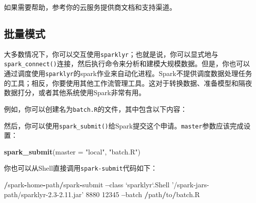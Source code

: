 \documentclass[
]{article}
\newenvironment{Shaded}{\begin{snugshade}}{\end{snugshade}}
\newcommand{\DataTypeTok}[1]{\textcolor[rgb]{0.13,0.29,0.53}{#1}}
\newcommand{\DecValTok}[1]{\textcolor[rgb]{0.00,0.00,0.81}{#1}}
\newcommand{\KeywordTok}[1]{\textcolor[rgb]{0.13,0.29,0.53}{\textbf{#1}}}
\newcommand{\NormalTok}[1]{#1}
\newcommand{\OperatorTok}[1]{\textcolor[rgb]{0.81,0.36,0.00}{\textbf{#1}}}
\newcommand{\StringTok}[1]{\textcolor[rgb]{0.31,0.60,0.02}{#1}}
\begin{document}
如果需要帮助，参考你的云服务提供商文档和支持渠道。

\hypertarget{ux6279ux91cfux6a21ux5f0f}{%
\subsection{批量模式}\label{ux6279ux91cfux6a21ux5f0f}}

大多数情况下，你可以交互使用\texttt{sparklyr}；也就是说，你可以显式地与\texttt{spark\_connect()}连接，然后执行命令来分析和建模大规模数据。但是，你也可以通过调度使用\texttt{sparklyr}的spark作业来自动化进程。Spark不提供调度数据处理任务的工具；相反，你要使用其他工作流管理工具。这对于转换数据、准备模型和隔夜数据打分，或者其他系统使用Spark非常有用。

例如，你可以创建名为\texttt{batch.R}的文件，其中包含以下内容：

\begin{Shaded}
\end{Shaded}

然后，你可以使用\texttt{spark\_submit()}给Spark提交这个申请。\texttt{master}参数应该完成设置：

\begin{Shaded}
\begin{Highlighting}[]
\KeywordTok{spark_submit}\NormalTok{(}\DataTypeTok{master =} \StringTok{"local"}\NormalTok{, }\StringTok{"batch.R"}\NormalTok{)}
\end{Highlighting}
\end{Shaded}

你也可以从Shell直接调用\texttt{spark-submit}代码如下：

\begin{Shaded}
\begin{Highlighting}[]
\OperatorTok{/}\NormalTok{spark}\OperatorTok{-}\NormalTok{home}\OperatorTok{-}\NormalTok{path}\OperatorTok{/}\NormalTok{spark}\OperatorTok{-}\NormalTok{submit}
 \OperatorTok{--}\NormalTok{class }\StringTok{`}\DataTypeTok{sparklyr}\StringTok{`}\NormalTok{.Shell }\StringTok{'/spark-jars-path/sparklyr-2.3-2.11.jar'}
\DecValTok{8880} \DecValTok{12345} \OperatorTok{--}\NormalTok{batch }\OperatorTok{/}\NormalTok{path}\OperatorTok{/}\NormalTok{to}\OperatorTok{/}\NormalTok{batch.R}
\end{Highlighting}
\end{Shaded}
\end{document}
